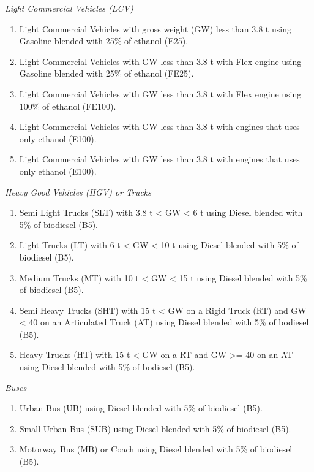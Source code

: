 \documentclass[12pt,graybox,envcountchap,sectrefs]{krantz}
\providecommand{\tightlist}{%
  \setlength{\itemsep}{0pt}\setlength{\parskip}{0pt}}
\theoremstyle{definition}
\theoremstyle{definition}
\theoremstyle{definition}
\theoremstyle{remark}
\begin{document}
\emph{Light Commercial Vehicles (LCV)}

\begin{enumerate}
\def\labelenumi{\arabic{enumi}.}
\tightlist
\item
  Light Commercial Vehicles with gross weight (GW) less than 3.8 t using
  Gasoline blended with 25\% of ethanol (E25).
\item
  Light Commercial Vehicles with GW less than 3.8 t with Flex engine
  using Gasoline blended with 25\% of ethanol (FE25).
\item
  Light Commercial Vehicles with GW less than 3.8 t with Flex engine
  using 100\% of ethanol (FE100).
\item
  Light Commercial Vehicles with GW less than 3.8 t with engines that
  uses only ethanol (E100).
\item
  Light Commercial Vehicles with GW less than 3.8 t with engines that
  uses only ethanol (E100).
\end{enumerate}

\emph{Heavy Good Vehicles (HGV) or Trucks}

\begin{enumerate}
\def\labelenumi{\arabic{enumi}.}
\tightlist
\item
  Semi Light Trucks (SLT) with 3.8 t \textless{} GW \textless{} 6 t
  using Diesel blended with 5\% of biodiesel (B5).
\item
  Light Trucks (LT) with 6 t \textless{} GW \textless{} 10 t using
  Diesel blended with 5\% of biodiesel (B5).
\item
  Medium Trucks (MT) with 10 t \textless{} GW \textless{} 15 t using
  Diesel blended with 5\% of biodiesel (B5).
\item
  Semi Heavy Trucks (SHT) with 15 t \textless{} GW on a Rigid Truck (RT)
  and GW \textless{} 40 on an Articulated Truck (AT) using Diesel
  blended with 5\% of bodiesel (B5).
\item
  Heavy Trucks (HT) with 15 t \textless{} GW on a RT and GW
  \textgreater{}= 40 on an AT using Diesel blended with 5\% of bodiesel
  (B5).
\end{enumerate}

\emph{Buses}

\begin{enumerate}
\def\labelenumi{\arabic{enumi}.}
\tightlist
\item
  Urban Bus (UB) using Diesel blended with 5\% of biodiesel (B5).
\item
  Small Urban Bus (SUB) using Diesel blended with 5\% of biodiesel (B5).
\item
  Motorway Bus (MB) or Coach using Diesel blended with 5\% of biodiesel
  (B5).
\end{enumerate}
\end{document}
